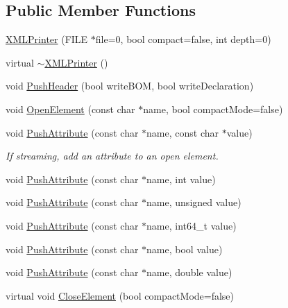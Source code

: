 \subsection*{Public Member Functions}
\begin{DoxyCompactItemize}
\item 
\mbox{\hyperlink{classtinyxml2_1_1_x_m_l_printer_aa6d3841c069085f5b8a27bc7103c04f7}{X\+M\+L\+Printer}} (F\+I\+LE $\ast$file=0, bool compact=false, int depth=0)
\item 
virtual \mbox{\hyperlink{classtinyxml2_1_1_x_m_l_printer_af4caefa48ea6436898fb1807de8d14c0}{$\sim$\+X\+M\+L\+Printer}} ()
\item 
void \mbox{\hyperlink{classtinyxml2_1_1_x_m_l_printer_a178c608ce8476043d5d6513819cde903}{Push\+Header}} (bool write\+B\+OM, bool write\+Declaration)
\item 
void \mbox{\hyperlink{classtinyxml2_1_1_x_m_l_printer_a20fb06c83bd13e5140d7dd13af06c010}{Open\+Element}} (const char $\ast$name, bool compact\+Mode=false)
\item 
void \mbox{\hyperlink{classtinyxml2_1_1_x_m_l_printer_a9a4e2c9348b42e147629d5a99f4af3f0}{Push\+Attribute}} (const char $\ast$name, const char $\ast$value)
\begin{DoxyCompactList}\small\item\em If streaming, add an attribute to an open element. \end{DoxyCompactList}\item 
void \mbox{\hyperlink{classtinyxml2_1_1_x_m_l_printer_a69120c82088597372d28d0a98f2ee7a1}{Push\+Attribute}} (const char $\ast$name, int value)
\item 
void \mbox{\hyperlink{classtinyxml2_1_1_x_m_l_printer_aa41039e51990aaf5342f3e0575a692c4}{Push\+Attribute}} (const char $\ast$name, unsigned value)
\item 
void \mbox{\hyperlink{classtinyxml2_1_1_x_m_l_printer_a9bc2fe21a83a70e6aa0415f2034ecbff}{Push\+Attribute}} (const char $\ast$name, int64\+\_\+t value)
\item 
void \mbox{\hyperlink{classtinyxml2_1_1_x_m_l_printer_a51f7950d7b7a19f0d3a0d549a318d45f}{Push\+Attribute}} (const char $\ast$name, bool value)
\item 
void \mbox{\hyperlink{classtinyxml2_1_1_x_m_l_printer_a1714867af40e68ca404c3e84b6cac2a6}{Push\+Attribute}} (const char $\ast$name, double value)
\item 
virtual void \mbox{\hyperlink{classtinyxml2_1_1_x_m_l_printer_af1fb439e5d800999646f333fa2f0699a}{Close\+Element}} (bool compact\+Mode=false)

\end{DoxyCompactItemize}
